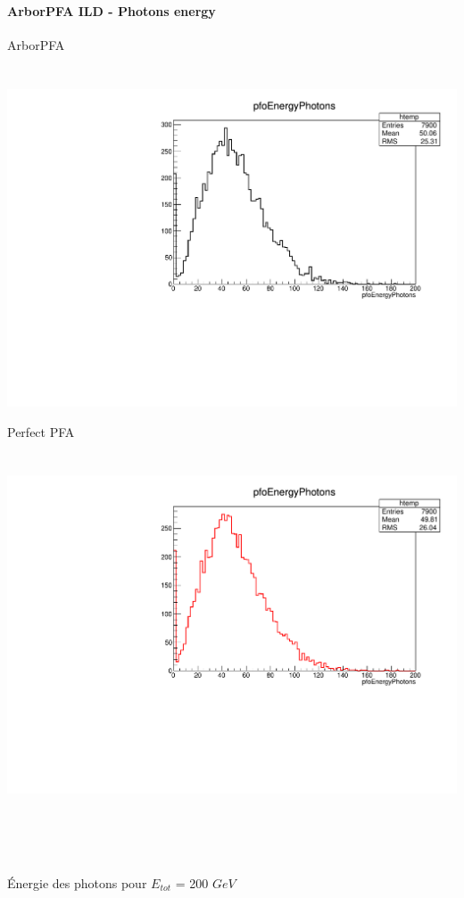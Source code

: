 \documentclass[8pt]{beamer}
\begin{document}
  \begin{frame}
  \frametitle{\backup}
  \framesubtitle{ArborPFA ILD - Photons energy}
    \begin{minipage}{0.48\linewidth}
      \begin{center}
        ArborPFA \\
        ~ \\
        ~~~~~\includegraphics[width=\linewidth]{pfoEnergyPhotons_ArborPFA.pdf}
      \end{center}
    \end{minipage}
    \begin{minipage}{0.48\linewidth}
      \begin{center}
        Perfect PFA \\
        ~ \\
        ~~~~~\includegraphics[width=\linewidth]{pfoEnergyPhotons_PerfectPFA.pdf}
      \end{center}
    \end{minipage}
    ~ \\
    ~ \\
    ~ \\
    \begin{center} Énergie des photons pour $E_{tot}$ = 200 $GeV$ \end{center}
  \end{frame}
\end{document}

